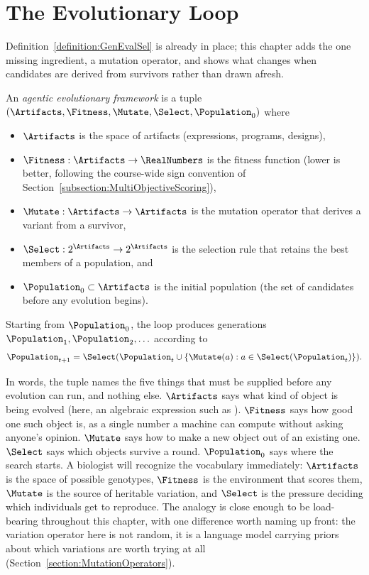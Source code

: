 \section{The Evolutionary Loop}
\label{section:EvolutionaryLoop}

Definition~\ref{definition:GenEvalSel} is already in place; this chapter adds the one missing ingredient, a mutation operator, and shows what changes when candidates are derived from survivors rather than drawn afresh.

\begin{definition}
\label{definition:EvolutionaryLoop}
An \emph{agentic evolutionary framework} is a tuple $(\Artifacts, \Fitness, \Mutate, \Select, \Population_0)$ where
\begin{itemize}
\item $\Artifacts$ is the space of artifacts (expressions, programs, designs),
\item $\Fitness : \Artifacts \to \RealNumbers$ is the fitness function (lower is better, following the course-wide sign convention of Section~\ref{subsection:MultiObjectiveScoring}),
\item $\Mutate : \Artifacts \to \Artifacts$ is the mutation operator that derives a variant from a survivor,
\item $\Select : 2^{\Artifacts} \to 2^{\Artifacts}$ is the selection rule that retains the best members of a population, and
\item $\Population_0 \subset \Artifacts$ is the initial population (the set of candidates before any evolution begins).
\end{itemize}
Starting from $\Population_0$, the loop produces generations $\Population_1, \Population_2, \ldots$ according to
\begin{equation}
\Population_{t+1} = \Select(\Population_t \cup \{\Mutate(a) : a \in \Select(\Population_t)\}) .
\label{equation:EvolutionaryLoop}
\end{equation}
\end{definition}

In words, the tuple names the five things that must be supplied before any evolution can run, and nothing else.
$\Artifacts$ says what kind of object is being evolved (here, an algebraic expression such as ).
$\Fitness$ says how good one such object is, as a single number a machine can compute without asking anyone's opinion.
$\Mutate$ says how to make a new object out of an existing one.
$\Select$ says which objects survive a round.
$\Population_0$ says where the search starts.
A biologist will recognize the vocabulary immediately: $\Artifacts$ is the space of possible genotypes, $\Fitness$ is the environment that scores them, $\Mutate$ is the source of heritable variation, and $\Select$ is the pressure deciding which individuals get to reproduce.
The analogy is close enough to be load-bearing throughout this chapter, with one difference worth naming up front: the variation operator here is not random, it is a language model carrying priors about which variations are worth trying at all (Section~\ref{section:MutationOperators}).

